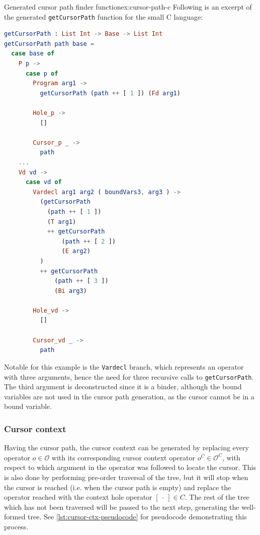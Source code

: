 \begin{example}{Generated cursor path finder function}{ex:cursor-path-c}
  Following is an excerpt of the generated \texttt{getCursorPath} function
  for the small C language:
  \begin{lstlisting}[language=elm,style=inline,backgroundcolor=\color{myexamplecolorback}]
getCursorPath : List Int -> Base -> List Int
getCursorPath path base =
  case base of
    P p ->
      case p of
        Program arg1 ->
          getCursorPath (path ++ [ 1 ]) (Fd arg1)

        Hole_p ->
          []

        Cursor_p _ ->
          path
    ...
    Vd vd ->
      case vd of
        Vardecl arg1 arg2 ( boundVars3, arg3 ) ->
          (getCursorPath
            (path ++ [ 1 ])
            (T arg1)
            ++ getCursorPath
                (path ++ [ 2 ])
                (E arg2)
          )
          ++ getCursorPath
              (path ++ [ 3 ])
              (Bi arg3)

        Hole_vd ->
          []

        Cursor_vd _ ->
          path
\end{lstlisting}

  Notable for this example is the \texttt{Vardecl} branch, which represents an
  operator with three arguments, hence the need for three recursive calls to
  \texttt{getCursorPath}. The third argument is deconstructed since it is a binder,
  although the bound variables are not used in the cursor path generation,
  as the cursor cannot be in a bound variable.

\end{example}


\subsubsection{Cursor context}

Having the cursor path, the cursor context can be generated by replacing every
operator $o \in \mathcal{O}$ with its corresponding cursor context operator
$o^C \in \mathcal{O}^C$, with respect to which argument in the operator was
followed to locate the cursor. This is also done by performing pre-order traversal
of the tree, but it will stop when the cursor is reached (i.e. when the
cursor path is empty) and replace the operator reached with the
context hole operator $[ \ \cdot \ ] \in C$. The rest of the tree which has not
been traversed will be passed to the next step, generating the well-formed tree.
See \cref{lst:cursor-ctx-pseudocode} for pseudocode demonstrating this process.


